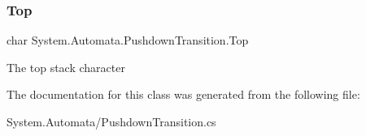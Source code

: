 \mbox{\label{class_system_1_1_automata_1_1_pushdown_transition_a956fe648291a21855c2d151668fd2411}} 
\subsubsection{\texorpdfstring{Top}{Top}}
{\footnotesize\ttfamily char System.\+Automata.\+Pushdown\+Transition.\+Top\hspace{0.3cm}{\ttfamily [get]}}



The top stack character 



The documentation for this class was generated from the following file\+:\begin{DoxyCompactItemize}
\item 
System.\+Automata/Pushdown\+Transition.\+cs\end{DoxyCompactItemize}
